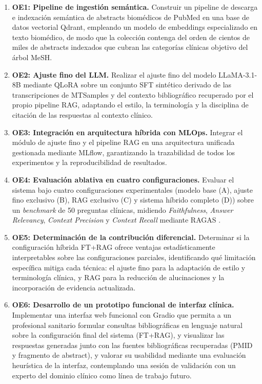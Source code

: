 \documentclass[11pt,a4paper,spanish]{book}
\numberwithin{equation}{chapter}
\numberwithin{figure}{chapter}
\begin{document}
\begin{enumerate}
  \item \textbf{OE1: Pipeline de ingestión semántica.} Construir un pipeline de descarga e indexación semántica de abstracts biomédicos de PubMed en una base de datos vectorial Qdrant, empleando un modelo de embeddings especializado en texto biomédico, de modo que la colección contenga del orden de cientos de miles de abstracts indexados que cubran las categorías clínicas objetivo del árbol MeSH.

  \item \textbf{OE2: Ajuste fino del LLM.} Realizar el ajuste fino del modelo LLaMA-3.1-8B \cite{grattafiori2024llama3herdmodels} mediante QLoRA \cite{dettmers2023qloraefficientfinetuningquantized} sobre un conjunto SFT sintético derivado de las transcripciones de MTSamples \cite{mtsamples_medical_2017} y del contexto bibliográfico recuperado por el propio pipeline RAG, adaptando el estilo, la terminología y la disciplina de citación de las respuestas al contexto clínico.

  \item \textbf{OE3: Integración en arquitectura híbrida con MLOps.} Integrar el módulo de ajuste fino y el pipeline RAG en una arquitectura unificada gestionada mediante MLflow, garantizando la trazabilidad de todos los experimentos y la reproducibilidad de resultados.

  \item \textbf{OE4: Evaluación ablativa en cuatro configuraciones.} Evaluar el sistema bajo cuatro configuraciones experimentales (modelo base (A), ajuste fino exclusivo (B), RAG exclusivo (C) y sistema híbrido completo (D)) sobre un \textit{benchmark} de 50 preguntas clínicas, midiendo \textit{Faithfulness}, \textit{Answer Relevancy}, \textit{Context Precision} y \textit{Context Recall} mediante RAGAS \cite{es2025ragasautomatedevaluationretrieval}.

  \item \textbf{OE5: Determinación de la contribución diferencial.} Determinar si la configuración híbrida FT+RAG ofrece ventajas estadísticamente interpretables sobre las configuraciones parciales, identificando qué limitación específica mitiga cada técnica: el ajuste fino para la adaptación de estilo y terminología clínica, y RAG para la reducción de alucinaciones y la incorporación de evidencia actualizada.

  \item \textbf{OE6: Desarrollo de un prototipo funcional de interfaz clínica.} Implementar una interfaz web funcional con Gradio que permita a un profesional sanitario formular consultas bibliográficas en lenguaje natural sobre la configuración final del sistema (FT+RAG), y visualizar las respuestas generadas junto con las fuentes bibliográficas recuperadas (PMID y fragmento de abstract), y valorar su usabilidad mediante una evaluación heurística de la interfaz, contemplando una sesión de validación con un experto del dominio clínico como línea de trabajo futuro.
\end{enumerate}
\end{document}
